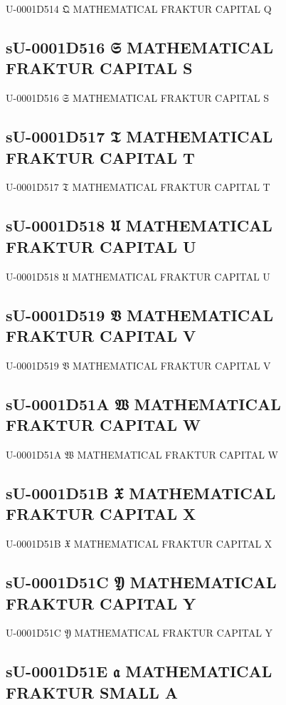 U-0001D514 𝔔 MATHEMATICAL FRAKTUR CAPITAL Q

\subsection{sU-0001D516 𝔖 MATHEMATICAL FRAKTUR CAPITAL S}

U-0001D516 𝔖 MATHEMATICAL FRAKTUR CAPITAL S

\subsection{sU-0001D517 𝔗 MATHEMATICAL FRAKTUR CAPITAL T}

U-0001D517 𝔗 MATHEMATICAL FRAKTUR CAPITAL T

\subsection{sU-0001D518 𝔘 MATHEMATICAL FRAKTUR CAPITAL U}

U-0001D518 𝔘 MATHEMATICAL FRAKTUR CAPITAL U

\subsection{sU-0001D519 𝔙 MATHEMATICAL FRAKTUR CAPITAL V}

U-0001D519 𝔙 MATHEMATICAL FRAKTUR CAPITAL V

\subsection{sU-0001D51A 𝔚 MATHEMATICAL FRAKTUR CAPITAL W}

U-0001D51A 𝔚 MATHEMATICAL FRAKTUR CAPITAL W

\subsection{sU-0001D51B 𝔛 MATHEMATICAL FRAKTUR CAPITAL X}

U-0001D51B 𝔛 MATHEMATICAL FRAKTUR CAPITAL X

\subsection{sU-0001D51C 𝔜 MATHEMATICAL FRAKTUR CAPITAL Y}

U-0001D51C 𝔜 MATHEMATICAL FRAKTUR CAPITAL Y

\subsection{sU-0001D51E 𝔞 MATHEMATICAL FRAKTUR SMALL A}

